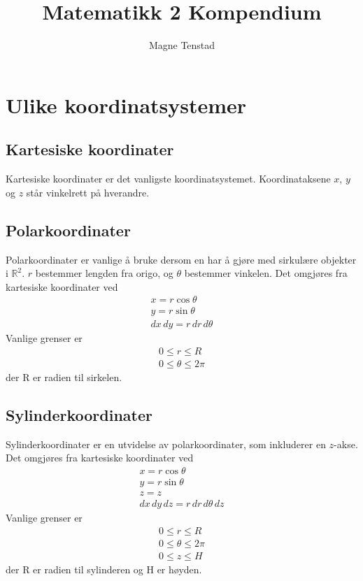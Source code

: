 \documentclass{article}
\title{Matematikk 2 Kompendium}
\author{Magne Tenstad}
\begin{document}
\maketitle

\clearpage

\tableofcontents

\clearpage




\section{Ulike koordinatsystemer}


\subsection{Kartesiske koordinater}
Kartesiske koordinater er det vanligste koordinatsystemet. Koordinataksene $x$, $y$ og $z$ står vinkelrett på hverandre.


\subsection{Polarkoordinater}
Polarkoordinater er vanlige å bruke dersom en har å gjøre med sirkulære objekter i $\mathbb{R}^2$. $r$ bestemmer lengden fra origo, og $\theta$ bestemmer vinkelen. Det omgjøres fra kartesiske koordinater ved
\begin{gather*}
    x = r\cos{\theta}\\
    y = r\sin{\theta}\\
    dx\,dy = r\,dr\,d\theta
\end{gather*}
Vanlige grenser er
\begin{gather*}
    0 \leq r \leq R\\
    0 \leq \theta \leq 2\pi
\end{gather*}
der R er radien til sirkelen.


\subsection{Sylinderkoordinater}
Sylinderkoordinater er en utvidelse av polarkoordinater, som inkluderer en $z$-akse.
Det omgjøres fra kartesiske koordinater ved
\begin{gather*}
    x = r\cos{\theta}\\
    y = r\sin{\theta}\\
    z = z\\
    dx\,dy\,dz = r\,dr\,d\theta\,dz
\end{gather*}
Vanlige grenser er
\begin{gather*}
    0 \leq r \leq R\\
    0 \leq \theta \leq 2\pi\\
    0 \leq z \leq H
\end{gather*}
der R er radien til sylinderen og H er høyden.
\end{document}
